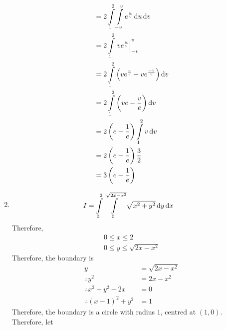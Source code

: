 \documentclass[fleqn, a4paper, 11pt, oneside]{amsart}
\theoremstyle{definition}
\theoremstyle{theorem}
\begin{document}
\begin{solution}
\begin{enumerate}[leftmargin = *]
\begin{align*}
                                                                                       & = 2 \int\limits_{1}^{2} \int\limits_{-v}^{v} e^{\frac{u}{v}} \dif u \dif v           \\
                                                                                       & = 2 \int\limits_{1}^{2} \left. v e^{\frac{u}{v}} \right|_{-v}^{v}                    \\
                                                                                       & = 2 \int\limits_{1}^{2} \left( v e^{\frac{v}{v}} - v e^{\frac{-v}{v}} \right) \dif v \\
                                                                                       & = 2 \int\limits_{1}^{2} \left( v e - \frac{v}{e} \right) \dif v                      \\
                                                                                       & = 2 \left( e - \frac{1}{e} \right) \int\limits_{1}^{2} v \dif v                      \\
                                                                                       & = 2 \left( e - \frac{1}{e} \right) \frac{3}{2}                                       \\
                                                                                       & = 3 \left( e - \frac{1}{e} \right)
			\end{align*}
		\item
			\begin{align*}
				I & = \int\limits_{0}^{2} \int\limits_{0}^{\sqrt{2 x - x^2}} \sqrt{x^2 + y^2} \dif y \dif x
			\end{align*}
			Therefore,
			\begin{gather*}
				0 \le x \le 2 \\
				0 \le y \le \sqrt{2 x - x^2}
			\end{gather*}
			Therefore, the boundary is
			\begin{align*}
				y                          & = \sqrt{2 x - x^2} \\
				\therefore y^2             & = 2 x - x^2        \\
				\therefore x^2 + y^2 - 2 x & = 0                \\
				\therefore (x - 1)^2 + y^2 & = 1
			\end{align*}
			Therefore, the boundary is a circle with radius $1$, centred at $(1,0)$.\\
			Therefore, let
			\begin{align*}

\end{align*}
\end{enumerate}
\end{solution}
\end{document}
